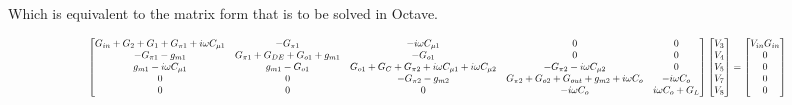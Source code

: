 Which is equivalent to the matrix form that is to be solved in Octave.

\begin{equation}
\scalemath{0.7}{
    \begin{bmatrix}
     G_{in}+G_2+G_1+G_{\pi1}+i\omega C_{\mu1} &  -G_{\pi1}      &  -i\omega C_{\mu1} &    0  &     0      \\
     -G_{\pi1}-g_{m1} & G_{\pi1}+G_{DE}+G_{o1}+g_{m1} & -G_{o1}  & 0   &  0      \\
     g_{m1}-i\omega C_{\mu1}   & g_{m1}-G_{o1}    & G_{o1}+G_C+G_{\pi2}+i\omega C_{\mu1}+i\omega C_{\mu2}  &  -G_{\pi2}-i\omega C_{\mu2}   &   0       \\
     0   & 0        & -G_{\pi2}-g_{m2}   & G_{\pi2}+G_{o2}+G_{out}+g_{m2}+i\omega C_{o} & -i\omega C_{o}      \\
     0   &  0      &  0 &  -i\omega C_{o}  &   i\omega C_{o}+G_L\\
    \end{bmatrix} 
    \begin{bmatrix}
        V_3\\
       V_4\\
        V_5\\
        V_7\\
        V_8\\
    \end{bmatrix}
    =
    \begin{bmatrix}
        V_{in}G_{in}\\
        0\\
        0\\
        0\\
        0
    \end{bmatrix}}
\label{matrix_octave_incremental}
\end{equation}